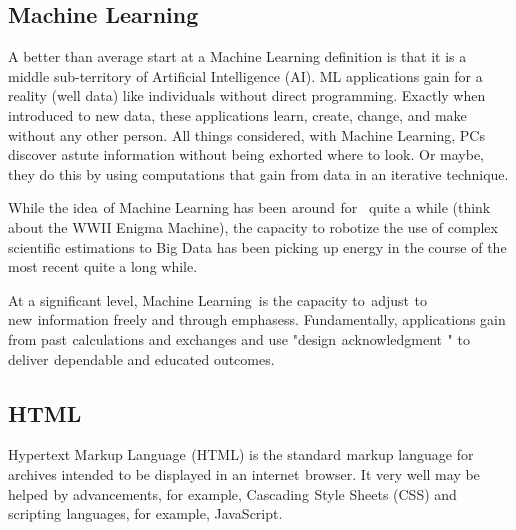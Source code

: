 \documentclass[oneside,12pt]{Classes/VTU}
\begin{document}
	\subsection{Machine Learning}
	A better than average start at a Machine Learning definition is that it is a middle sub-territory of Artificial Intelligence (AI). ML applications gain for a reality (well data) like individuals without direct programming. Exactly when introduced to new data, these applications learn, create, change, and make without any other person. All things considered, with Machine Learning, PCs discover astute information without being exhorted where to look. Or maybe, they do this by using computations that gain from data in an iterative technique.
	
	While the idea\tiny\textcolor{white}{s}\normalsize of Machine\tiny\textcolor{white}{f}\normalsize Learning\tiny\textcolor{white}{f}\normalsize has been\tiny\textcolor{white}{s}\normalsize around\tiny\textcolor{white}{s}\normalsize for\tiny\textcolor{white}{m}\normalsize quite a while (think about the WWII Enigma Machine), the capacity to robotize the use of complex scientific estimations to Big Data has been picking up energy in the course of the most recent quite a long while. 
	
	At a significant level, Machine\tiny\textcolor{white}{f}\normalsize Learning\tiny\textcolor{white}{g}\normalsize is the capacity to\tiny\textcolor{white}{e}\normalsize adjust\tiny\textcolor{white}{s}\normalsize to new\tiny\textcolor{white}{s}\normalsize information  freely and through emphasess. Fundamentally, applications gain from past\tiny\textcolor{white}{s}\normalsize calculations and exchanges and use "design\tiny\textcolor{white}{s}\normalsize acknowledgment\tiny\textcolor{white}{s}\normalsize " to deliver\tiny\textcolor{white}{s}\normalsize dependable and educated outcomes.
	\subsection{HTML}
	Hypertext\tiny\textcolor{white}{f}\normalsize Markup\tiny\textcolor{white}{f}\normalsize Language\tiny\textcolor{white}{s}\normalsize (HTML) is the standard\tiny\textcolor{white}{s}\normalsize markup language for archives intended to be displayed in an internet\tiny\textcolor{white}{s}\normalsize browser. It very well may be helped\tiny\textcolor{white}{s}\normalsize by advancements, for example, Cascading\tiny\textcolor{white}{s}\normalsize Style Sheets (CSS) and scripting\tiny\textcolor{white}{s}\normalsize languages, for example, JavaScript. 
	
\end{document}
